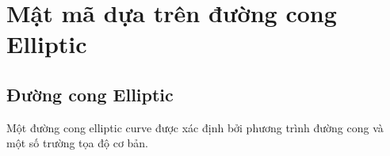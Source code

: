 \documentclass[a4paper,12pt]{report}
\begin{document}
\chapter{Mật mã dựa trên đường cong Elliptic}
\section{Đường cong Elliptic}
Một đường cong elliptic curve được xác định bởi phương trình đường cong và một số trường tọa độ cơ bản.
\end{document}
